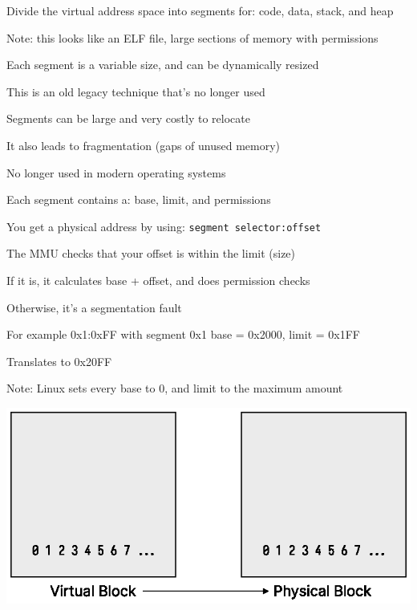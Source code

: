   \begin{slide}


    Divide the virtual address space into segments for: code, data, stack, and heap

    \leftspace{}Note: this looks like an ELF file, large sections of memory with permissions
    \medskip

    Each segment is a variable size, and can be dynamically resized

    \leftspace{}This is an old legacy technique that's no longer used
    \medskip

    Segments can be large and very costly to relocate

    \leftspace{}It also leads to fragmentation (gaps of unused memory)
    \medskip

    No longer used in modern operating systems

  \end{slide}

  \begin{slide}


    Each segment contains a: base, limit, and permissions

    \leftspace{}You get a physical address by using: \texttt{segment selector:offset}
    \medskip

    The MMU checks that your offset is within the limit (size)

    \leftspace{}If it is, it calculates base + offset, and does permission checks

    \leftspace{}\leftspace{}Otherwise, it's a segmentation fault
    \medskip

    For example 0x1:0xFF with segment 0x1 base = 0x2000, limit = 0x1FF

    \leftspace{}Translates to 0x20FF
    \medskip

    Note: Linux sets every base to 0, and limit to the maximum amount
  \end{slide}

  \begin{slide}
    

    \centering
    \includegraphics{virt-to-phy-block.eps}

  \end{slide}

